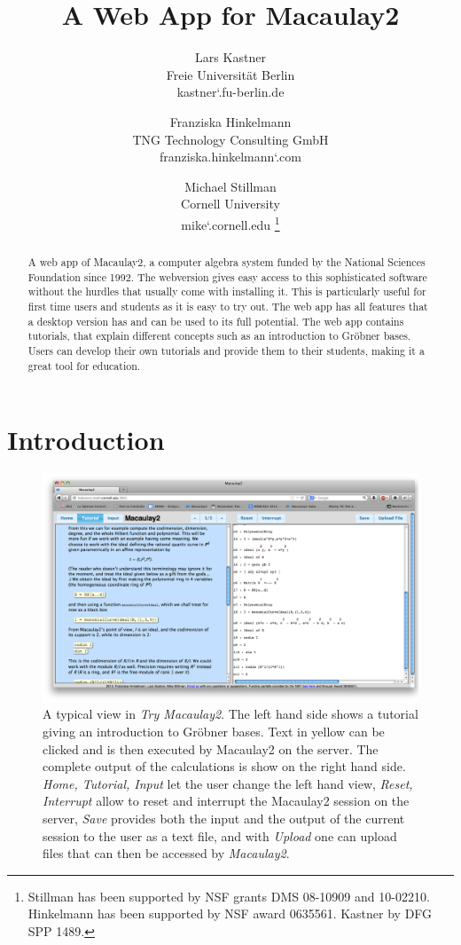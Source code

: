 \documentclass[]{article}
\title{A Web App for Macaulay2}
\author{Lars Kastner\\ Freie Universit\"at Berlin \\{\small kastner\char`\@math.fu-berlin.de} \and 
Franziska Hinkelmann\\TNG Technology Consulting GmbH \\{\small franziska.hinkelmann\char`\@tngtech.com} \and 
Michael Stillman\\Cornell University \\{\small mike\char`\@math.cornell.edu} \thanks{Stillman has been supported by NSF grants DMS 08-10909 and 10-02210. Hinkelmann has been supported by NSF award 0635561. Kastner by DFG SPP 1489. 
} }
\date{}
\def\tryM2{{\it Try Macaulay2}}
\def\M2{{\it Macaulay2}}
\begin{document}
\ifpdf
{}
\else
{}
\fi



\maketitle



\begin{abstract}

    A web app of Macaulay2, a computer algebra system funded by the
    National Sciences Foundation since 1992. The webversion gives easy
    access to this sophisticated software without the hurdles that
    usually come with installing it. This is particularly useful for
    first time users and students as it is easy to try out. The
    web app has all features that a desktop version has and can be
    used to its full potential. The web app contains tutorials,
    that explain different concepts such as an introduction to
    Gr\"obner bases. Users can develop their own tutorials and provide
    them to their students, making it a great tool for education.

\end{abstract}


\section{Introduction}
\begin{figure}[htb]
    \includegraphics[width=.95\textwidth]{homeWebsite.jpg}
    \caption{A typical view in \tryM2. The left hand
      side shows a tutorial giving an introduction to Gr\"obner
      bases. Text in yellow can be clicked and is then executed by
      Macaulay2 on the server. The complete output of the calculations
      is show on the right hand side. {\it Home, Tutorial, Input} let
      the user change the left hand view, {\it Reset, Interrupt} allow
      to reset and interrupt the Macaulay2 session on the server, {\it
        Save} provides both the input and the output of the current
      session to the user as a text file, and with {\it Upload} one
      can upload files that can then be accessed by \M2.}
    \label{fig:home}
\end{figure}
\end{document}
